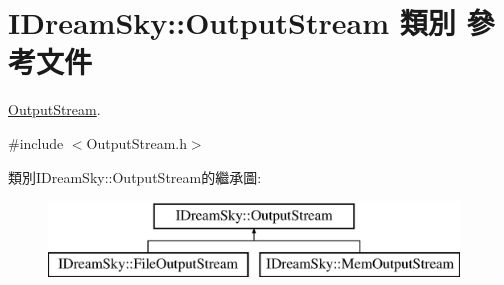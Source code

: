\hypertarget{class_i_dream_sky_1_1_output_stream}{}\section{I\+Dream\+Sky\+:\+:Output\+Stream 類別 參考文件}
\label{class_i_dream_sky_1_1_output_stream}


\hyperlink{class_i_dream_sky_1_1_output_stream}{Output\+Stream}.  




{\ttfamily \#include $<$Output\+Stream.\+h$>$}

類別\+I\+Dream\+Sky\+:\+:Output\+Stream的繼承圖\+:\begin{figure}[H]
\begin{center}
\leavevmode
\includegraphics[height=2.000000cm]{class_i_dream_sky_1_1_output_stream}
\end{center}
\end{figure}
